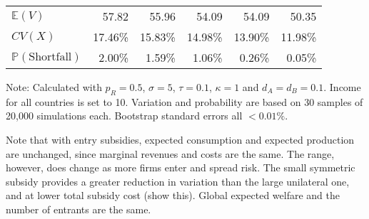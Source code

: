 \documentclass{article}
\begin{document}
\begin{table}
\begin{threeparttable}
\begin{tabular}{lrrrrr}
            $\mathbb{E}(V)$ & 57.82 & 55.96 & 54.09 & 54.09 & 50.35 \\
            $CV(X)$ & 17.46\% & 15.83\% & 14.98\% & 13.90\% & 11.98\% \\
            $\mathbb{P}(\text{Shortfall})$ & 2.00\% & 1.59\% & 1.06\% & 0.26\% & 0.05\% \\ 
            \bottomrule
        \end{tabular}
        \begin{tablenotes}
            \small \item Note: Calculated with $p_R = 0.5$, $\sigma = 5$, $\tau = 0.1$, $\kappa = 1$ and $d_A = d_B = 0.1$. Income for all countries is set to 10. Variation and probability are based on 30 samples of 20,000 simulations each. Bootstrap standard errors all $<0.01\%$.
        \end{tablenotes}
    \end{threeparttable}
\end{table}

Note that with entry subsidies, expected consumption and expected production are unchanged, since marginal revenues and costs are the same. The range, however, does change as more firms enter and spread risk. The small symmetric subsidy provides a greater reduction in variation than the large unilateral one, and at lower total subsidy cost (show this). Global expected welfare and the number of entrants are the same.
\end{document}
